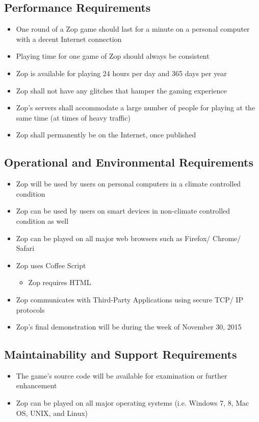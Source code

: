 \documentclass[12pt]{article}
\begin{document}
\subsection{Performance Requirements}
\begin{itemize}
 \item One round of a Zop game should last for a minute on a personal computer with a decent Internet connection
 \item Playing time for one game of Zop should always be consistent
 \item Zop is available for playing 24 hours per day and 365 days per year
 \item Zop shall not have any glitches that hamper the gaming experience
 \item Zop’s servers shall accommodate a large number of people for playing at the same time (at times of heavy traffic)
 \item Zop shall permanently be on the Internet, once published
\end{itemize}
 \subsection{Operational and Environmental Requirements}
\begin{itemize}
 \item Zop will be used by users on personal computers in a climate controlled condition
 \item Zop can be used by users on smart devices in non-climate controlled condition as well
 \item Zop can be played on all major web browsers such as Firefox/ Chrome/ Safari
 \item Zop uses Coffee Script
  \begin{itemize}
   \item Zop requires HTML
  \end{itemize}
 \item Zop communicates with Third-Party Applications using secure TCP/ IP protocols
 \item Zop’s final demonstration will be during the week of November 30, 2015
\end{itemize} 
 \subsection{Maintainability and Support Requirements}
\begin{itemize}
 \item The game’s source code will be available for examination or further enhancement
 \item Zop can be played on all major operating systems (i.e. Windows 7, 8, Mac OS, UNIX, and Linux)
\end{itemize}
\end{document}
